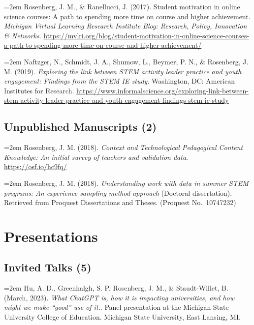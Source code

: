 \documentclass[
  14,
]{article}
\begin{document}
\hangindent=2em Rosenberg, J. M., \& Ranellucci, J. (2017). Student
motivation in online science courses: A path to spending more time on
course and higher achievement. \emph{Michigan Virtual Learning Research
Institute Blog: Research, Policy, Innovation \& Networks}.
\url{https://mvlri.org/blog/student-motivation-in-online-science-courses-a-path-to-spending-more-time-on-course-and-higher-achievement/}

\hangindent=2em Naftzger, N., Schmidt, J. A., Shumow, L., Beymer, P. N.,
\& Rosenberg, J. M. (2019). \emph{Exploring the link between STEM
activity leader practice and youth engagement: Findings from the STEM IE
study}. Washington, DC: American Institutes for Research.
\url{https://www.informalscience.org/exploring-link-between-stem-activity-leader-practice-and-youth-engagement-findings-stem-ie-study}

\hypertarget{unpublished-manuscripts-2}{%
\subsection{Unpublished Manuscripts
(2)}\label{unpublished-manuscripts-2}}

\hangindent=2em Rosenberg, J. M. (2018). \emph{Context and Technological
Pedagogical Content Knowledge: An initial survey of teachers and
validation data}. \url{https://osf.io/hc9fq/}

\hangindent=2em Rosenberg, J. M. (2018). \emph{Understanding work with
data in summer STEM programs: An experience sampling method approach}
(Doctoral dissertation). Retrieved from Proquest Dissertations and
Theses. (Proquest No.~10747232)

\hypertarget{presentations}{%
\section{Presentations}\label{presentations}}

\hypertarget{invited-talks-5}{%
\subsection{Invited Talks (5)}\label{invited-talks-5}}

\hangindent=2em Hu, A. D., Greenhalgh, S. P. Rosenberg, J. M., \&
Staudt-Willet, B. (March, 2023). \emph{What ChatGPT is, how it is
impacting universities, and how might we make ``good'' use of it.}.
Panel presentation at the Michigan State University College of
Education. Michigan State University, East Lansing, MI.
\end{document}
